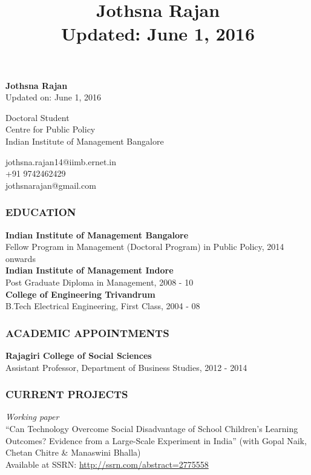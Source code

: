 \documentclass[12pt, a4paper]{article}
\title{\textbf{Jothsna Rajan \\ \small{Updated: June 1, 2016} }}
\date{}
\begin{document}
	\begin{center}
		\large{\textbf{Jothsna Rajan}} \\
		\small{Updated on: June 1, 2016}
	\end{center}
	\begin{multicols}{2}
		\begin{flushleft}
			\noindent Doctoral Student \\
			Centre for Public Policy \\
			Indian Institute of Management Bangalore \\
		\end{flushleft}
		\begin{flushright}
			\noindent jothsna.rajan14@iimb.ernet.in \\
			+91 9742462429 \\
			jothsnarajan@gmail.com \\
		\end{flushright}
	\end{multicols}
	\subsubsection*{EDUCATION}
	
	\noindent\textbf{Indian Institute of Management Bangalore} \\
	Fellow Program in Management (Doctoral Program) in Public Policy, 2014 onwards \\
	
	\noindent\textbf{Indian Institute of Management Indore} \\
	Post Graduate Diploma in Management, 2008 - 10 \\
	
	\noindent\textbf{College of Engineering Trivandrum} \\
	B.Tech Electrical Engineering, First Class, 2004 - 08
	
	\subsubsection*{ACADEMIC APPOINTMENTS}
		\noindent\textbf{Rajagiri College of Social Sciences} \\
		Assistant Professor, Department of Business Studies, 2012 - 2014 
	\subsubsection*{CURRENT PROJECTS}
		\noindent \textit{Working paper} \\
		``Can Technology Overcome Social Disadvantage of School Children's Learning Outcomes? Evidence from a Large-Scale Experiment in India'' (with Gopal Naik, Chetan Chitre \& Manaswini Bhalla) \\ Available at SSRN: \url{http://ssrn.com/abstract=2775558} 
\end{document}
